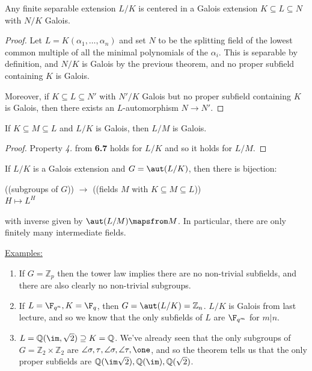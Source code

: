 \documentclass[a4paper, 10pt, twocolumn]{amsart}
\begin{document}
\begin{corollary}
Any finite separable extension $L/K$ is centered in a Galois extension $K \subseteq L \subseteq N$ with $N/K$ Galois.
\end{corollary}
\begin{proof}
Let $L = K(\alpha_1, \ldots, \alpha_n)$ and set $N$ to be the splitting field of the lowest common multiple of all the minimal polynomials of the $\alpha_i$. This is separable by definition, and $N/K$ is Galois by the previous theorem, and no proper subfield containing $K$ is Galois.

Moreover, if $K \subseteq L \subseteq N'$ with $N'/K$ Galois but no proper subfield containing $K$ is Galois, then there exists an $L$-automorphism $N \to N'$.
\end{proof}
\begin{corollary}
If $K \subseteq M \subseteq L$ and $L/K$ is Galois, then $L/M$ is Galois.
\end{corollary}
\begin{proof}
Property \textit{4.} from \textbf{6.7} holds for $L/K$ and so it holds for $L/M$.
\end{proof}
\begin{theorem}
If $L/K$ is a Galois extension and $G = \aut(L/K)$, then there is bijection:
\begin{center}
((subgroups of $G$)) $\to$ ((fields $M$ with $K \subseteq M \subseteq L$))\\
$H \mapsto L^H$
\end{center}
with inverse given by $\aut(L/M)\mapsfrom M$. In particular, there are only finitely many intermediate fields.
\end{theorem}
\underline{Examples:}
\begin{enumerate}
\item If $G = \mathbb{Z}_p$ then the tower law implies there are no non-trivial subfields, and there are also clearly no non-trivial subgroups.
\item If $L = \F_{q^n}, K = \F_q$, then $G = \aut(L/K) = \mathbb{Z}_n$. $L/K$ is Galois from last lecture, and so we know that the only subfields of $L$ are $\F_{q^m}$ for $m|n$.
\item $L = \mathbb{Q}(\im, \sqrt{2}) \supseteq K = \mathbb{Q}$. We've already seen that the only subgroups of $G = \mathbb{Z}_2 \times \mathbb{Z}_2$ are $\angle{\sigma, \tau}, \angle{\sigma}, \angle{\tau}, \one$, and so the theorem tells us that the only proper subfields are $\mathbb{Q}(\im\sqrt{2}), \mathbb{Q}(\im), \mathbb{Q}(\sqrt{2})$.
\end{enumerate}
\end{document}
